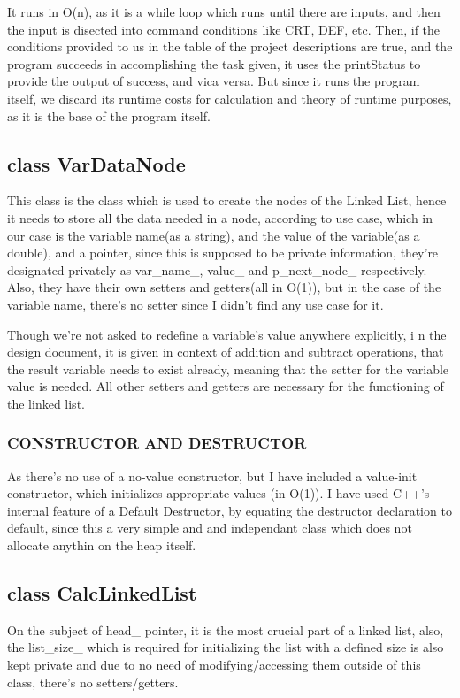 \documentclass[a4paper]{article}
\begin{document}
    It runs in {\color{lightblue}O(n)}, as it is a while loop which runs until there are 
    inputs, and then the input is disected into command conditions like 
    CRT, DEF, etc. Then, if the conditions provided to us in the table of 
    the project descriptions are true, and the program succeeds in 
    accomplishing the task given, it uses the {\color{draculapurple}printStatus} 
    to provide the output of success, and vica versa. But since it runs the program itself, 
    we discard its runtime costs for calculation and theory of runtime purposes, 
    as it is the base of the program itself.
    \subsection{{\color{orange}class} {\color{draculapurple}VarDataNode}}
    This class is the class which is used to create the nodes of the Linked List, 
    hence it needs to store all the data needed in a node, according to use case, 
    which in our case is the variable name{\color{orange}(as a string)}, and the value of the 
    variable{\color{orange}(as a double)}, and a pointer, since this is supposed to be private information, 
    they're designated privately as var\_name\_, value\_ and p\_next\_node\_ respectively. 
    Also, they have their own setters and getters{\color{lightblue}(all in O(1))}, 
    but in the case of the variable name, there's no setter since I didn't find 
    any use case for it. 
    
    Though we're not asked to redefine a variable's value anywhere explicitly, i
    n the design document, it is given in context of addition and subtract operations, 
    that the result variable needs to exist already, meaning that the setter 
    for the variable value is needed. All other setters and getters are 
    necessary for the functioning of the linked list. 
    \subsubsection{\color{draculapurple}CONSTRUCTOR AND DESTRUCTOR}
    As there's no use of a no-value constructor, but I have included a value-init constructor, 
    which initializes appropriate values {\color{lightblue}(in O(1))}.
    I have used C++'s internal feature of a Default Destructor, 
    by equating the destructor declaration to default, since this a very 
    simple and and independant class which does not allocate anythin on the heap itself. 
    \subsection{{\color{orange}class} {\color{draculapurple}CalcLinkedList}}
    On the subject of {\color{LimeGreen}head\_} pointer, it is the most crucial part of a linked list, 
    also, the {\color{LimeGreen}list\_size\_} which is required for initializing 
    the list with a defined size is also kept private and due to no 
    need of modifying/accessing them outside of this class, there's no setters/getters.
\end{document}
